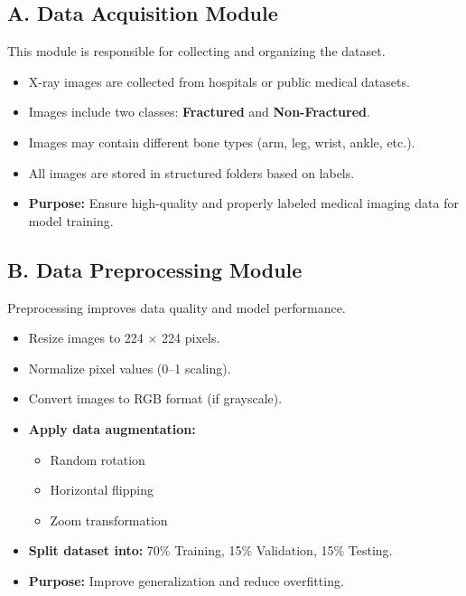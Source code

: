 \documentclass[a4paper,12pt]{report}
\begin{document}
    \subsection*{A. Data Acquisition Module}
    This module is responsible for collecting and organizing the dataset.
    \begin{itemize}
        \item X-ray images are collected from hospitals or public medical datasets.
        \item Images include two classes: \textbf{Fractured} and \textbf{Non-Fractured}.
        \item Images may contain different bone types (arm, leg, wrist, ankle, etc.).
        \item All images are stored in structured folders based on labels.
        \item \textbf{Purpose:} Ensure high-quality and properly labeled medical imaging data for model training.
    \end{itemize}

    \subsection*{B. Data Preprocessing Module}
    Preprocessing improves data quality and model performance.
    \begin{itemize}
        \item Resize images to 224 $\times$ 224 pixels.
        \item Normalize pixel values (0–1 scaling).
        \item Convert images to RGB format (if grayscale).
        \item \textbf{Apply data augmentation:}
        \begin{itemize}
            \item Random rotation
            \item Horizontal flipping
            \item Zoom transformation
        \end{itemize}
        \item \textbf{Split dataset into:} 70\% Training, 15\% Validation, 15\% Testing.
        \item \textbf{Purpose:} Improve generalization and reduce overfitting.
    \end{itemize}
\end{document}

